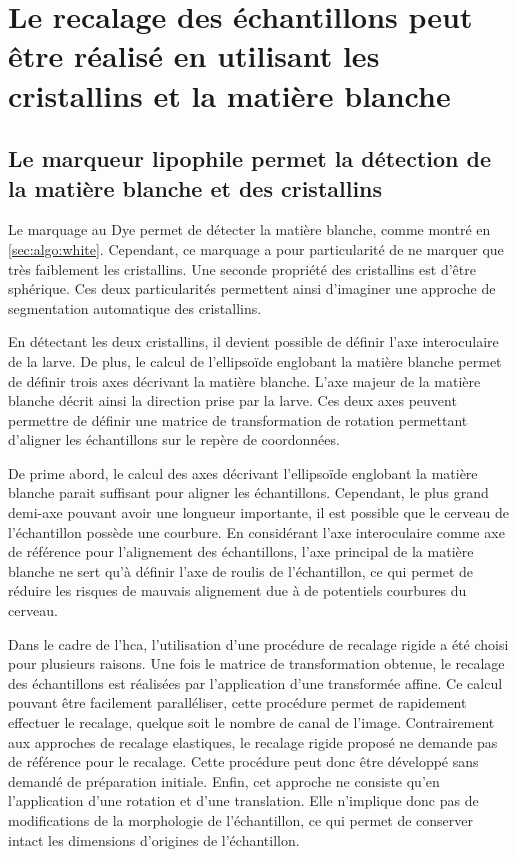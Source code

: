 \documentclass[\main/main.tex]{subfiles}
\begin{document}
\section{\label{sec:algo:recalage}Le recalage des échantillons peut être réalisé en utilisant les cristallins et la matière blanche
}

\subsection{Le marqueur lipophile permet la détection de la matière blanche et des cristallins}

%
Le marquage au Dye permet de détecter la matière blanche, comme montré en \autoref{sec:algo:white}.
%
Cependant, ce marquage a pour particularité de ne marquer que très faiblement les cristallins.
%
Une seconde propriété des cristallins est d'être sphérique.
%
Ces deux particularités permettent ainsi d'imaginer une approche de segmentation automatique des cristallins.
%

%
En détectant les deux cristallins, il devient possible de définir l'axe interoculaire de la larve.
%
De plus, le calcul de l'ellipsoïde englobant la matière blanche permet de définir trois axes décrivant la matière blanche.
%
L'axe majeur de la matière blanche décrit ainsi la direction prise par la larve.
%
Ces deux axes peuvent permettre de définir une matrice de transformation de rotation permettant d'aligner les échantillons sur le repère de coordonnées.

%
De prime abord, le calcul des axes décrivant l'ellipsoïde englobant la matière blanche parait suffisant pour aligner les échantillons.
%
Cependant, le plus grand demi-axe pouvant avoir une longueur importante, il est possible que le cerveau de l'échantillon possède une courbure.
%
En considérant l'axe interoculaire comme axe de référence pour l'alignement des échantillons, l'axe principal de la matière blanche ne sert qu'à définir l'axe de roulis de l'échantillon, ce qui permet de réduire les risques de mauvais alignement due à de potentiels courbures du cerveau.

%
Dans le cadre de l'hca{}, l'utilisation d'une procédure de recalage rigide a été choisi pour plusieurs raisons.
%
Une fois le matrice de transformation obtenue, le recalage des échantillons est réalisées par l'application d'une transformée affine.
%
Ce calcul pouvant être facilement paralléliser, cette procédure permet de rapidement effectuer le recalage, quelque soit le nombre de canal de l'image.
%
Contrairement aux approches de recalage elastiques, le recalage rigide proposé ne demande pas de référence pour le recalage.
%
Cette procédure peut donc être développé sans demandé de préparation initiale.
%
Enfin, cet approche ne consiste qu'en l'application d'une rotation et d'une translation.
%
Elle n'implique donc pas de modifications de la morphologie de l'échantillon, ce qui permet de conserver intact les dimensions d'origines de l'échantillon.
\end{document}
